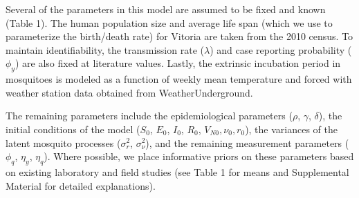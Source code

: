 \documentclass[10pt,letterpaper]{article}
\begin{document}
Several of the parameters in this model are assumed to be fixed and known (Table 1).
The human population size and average life span (which we use to parameterize the birth/death rate) for Vitoria are taken from the 2010 census.
To maintain identifiability, the transmission rate ($\lambda$) and case reporting probability ($\phi_y$) are also fixed at literature values.
Lastly, the extrinsic incubation period in mosquitoes is modeled as a function of weekly mean temperature and forced with weather station data obtained from WeatherUnderground.

The remaining parameters include the epidemiological parameters ($\rho$, $\gamma$, $\delta$), the initial conditions of the model ($S_0$, $E_0$, $I_0$, $R_0$, $V_{N0}, \nu_0, r_0$), the variances of the latent mosquito processes ($\sigma^2_r$, $\sigma^2_{\nu}$), and the remaining measurement parameters ($\phi_q$, $\eta_y$, $\eta_q$).  
Where possible, we place informative priors on these parameters based on existing laboratory and field studies (see Table 1 for means and Supplemental Material for detailed explanations).
\end{document}
